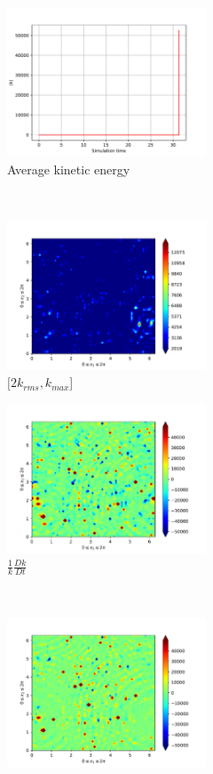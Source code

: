 \begin{figure}[H]
    \begin{subfigure}[H]{0.45\textwidth}
        \includegraphics[height=1.75in]{media/run-cds-65-25k/ke-average2449}
        \caption{Average kinetic energy}
    \end{subfigure}
    ~
    \begin{subfigure}[H]{0.45\textwidth}
        \includegraphics[height=1.75in]{media/run-cds-65-25k/ke-2-2449}
        \caption{$[2k_{rms}, k_{max} $] }
    \end{subfigure}
    \newline
    \begin{subfigure}[H]{0.45\textwidth}
        \includegraphics[height=1.75in]{media/run-cds-65-25k/ke-2449}
        \caption{$\frac{1}{k} \frac{D k}{Dt}$}
    \end{subfigure}
    ~
    \begin{subfigure}{0.45\textwidth}
        \includegraphics[height=1.75in]{media/run-cds-65-25k/A-ke-449}

\end{subfigure}
\end{figure}
